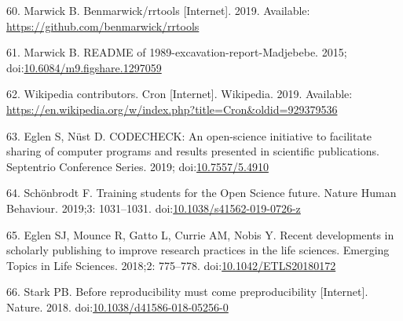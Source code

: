 \documentclass[10pt,letterpaper]{article}
\begin{document}
\leavevmode\hypertarget{ref-marwick_rrtools_2019}{}%
60. Marwick B. Benmarwick/rrtools {[}Internet{]}. 2019. Available:
\url{https://github.com/benmarwick/rrtools}

\leavevmode\hypertarget{ref-marwick_readme_2015}{}%
61. Marwick B. README of 1989-excavation-report-Madjebebe. 2015;
doi:\href{https://doi.org/10.6084/m9.figshare.1297059}{10.6084/m9.figshare.1297059}

\leavevmode\hypertarget{ref-wikipedia_contributors_cron_2019}{}%
62. Wikipedia contributors. Cron {[}Internet{]}. Wikipedia. 2019.
Available:
\url{https://en.wikipedia.org/w/index.php?title=Cron\&oldid=929379536}

\leavevmode\hypertarget{ref-eglen_codecheck_2019}{}%
63. Eglen S, Nüst D. CODECHECK: An open-science initiative to facilitate
sharing of computer programs and results presented in scientific
publications. Septentrio Conference Series. 2019;
doi:\href{https://doi.org/10.7557/5.4910}{10.7557/5.4910}

\leavevmode\hypertarget{ref-schonbrodt_training_2019}{}%
64. Schönbrodt F. Training students for the Open Science future. Nature
Human Behaviour. 2019;3: 1031--1031.
doi:\href{https://doi.org/10.1038/s41562-019-0726-z}{10.1038/s41562-019-0726-z}

\leavevmode\hypertarget{ref-eglen_recent_2018}{}%
65. Eglen SJ, Mounce R, Gatto L, Currie AM, Nobis Y. Recent developments
in scholarly publishing to improve research practices in the life
sciences. Emerging Topics in Life Sciences. 2018;2: 775--778.
doi:\href{https://doi.org/10.1042/ETLS20180172}{10.1042/ETLS20180172}

\leavevmode\hypertarget{ref-stark_before_2018}{}%
66. Stark PB. Before reproducibility must come preproducibility
{[}Internet{]}. Nature. 2018.
doi:\href{https://doi.org/10.1038/d41586-018-05256-0}{10.1038/d41586-018-05256-0}

\nolinenumbers
\end{document}
